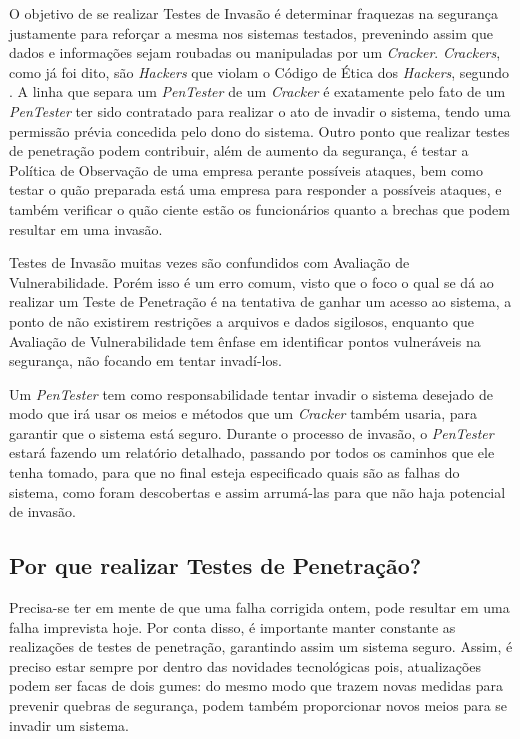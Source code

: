 O objetivo de se realizar Testes de Invasão é determinar fraquezas na segurança justamente para reforçar a mesma nos sistemas testados, prevenindo assim que dados e informações sejam roubadas ou manipuladas por um {\em Cracker}. {\em Crackers}, como já foi dito, são {\em Hackers} que violam o Código de Ética dos {\em Hackers}, segundo . A linha que separa um {\em PenTester} de um {\em Cracker} é exatamente pelo fato de um {\em PenTester} ter sido contratado para realizar o ato de invadir o sistema, tendo uma permissão prévia concedida pelo dono do sistema. Outro ponto que realizar testes de penetração podem contribuir, além de aumento da segurança, é testar a Política de Observação de uma empresa perante possíveis ataques, bem como testar o quão preparada está uma empresa para responder a possíveis ataques, e também verificar o quão ciente estão os funcionários quanto a brechas que podem resultar em uma invasão.

Testes de Invasão muitas vezes são confundidos com Avaliação de Vulnerabilidade. Porém isso é um erro comum, visto que o foco o qual se dá ao realizar um Teste de Penetração é na tentativa de ganhar um acesso ao sistema, a ponto de não existirem restrições a arquivos e dados sigilosos, enquanto que Avaliação de Vulnerabilidade tem ênfase em identificar pontos vulneráveis na segurança, não focando em tentar invadí-los.

Um {\em PenTester} tem como responsabilidade tentar invadir o sistema desejado de modo que irá usar os meios e métodos que um {\em Cracker} também usaria, para garantir que o sistema está seguro. Durante o processo de invasão, o {\em PenTester} estará fazendo um relatório detalhado, passando por todos os caminhos que ele tenha tomado, para que no final esteja especificado quais são as falhas do sistema, como foram descobertas e assim arrumá-las para que não haja potencial de invasão.

\subsection{Por que realizar Testes de Penetração?}
\label{ss.whypentest}

Precisa-se ter em mente de que uma falha corrigida ontem, pode resultar em uma falha imprevista hoje. Por conta disso, é importante manter constante as realizações de testes de penetração, garantindo assim um sistema seguro. Assim, é preciso estar sempre por dentro das novidades tecnológicas pois, atualizações podem ser facas de dois gumes: do mesmo modo que trazem novas medidas para prevenir quebras de segurança, podem também proporcionar novos meios para se invadir um sistema.

